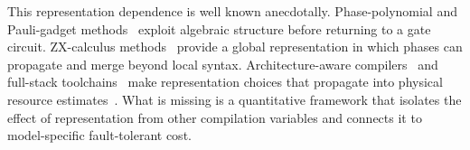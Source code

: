 \documentclass[aps,prx,reprint,floatfix,superscriptaddress]{revtex4-2}
\begin{document}
This representation dependence is well known anecdotally. Phase-polynomial
and Pauli-gadget
methods~\cite{amy2014tdepth,nam2018automated,cowtan2020phase,amy2019cnot,beaudrap2020techniques}
exploit algebraic structure before returning to a gate circuit.
ZX-calculus
methods~\cite{duncan2020graph,kissinger2020reducing,kissinger2020pyzx,vandewetering2020zx}
provide a global representation in which phases can propagate and merge
beyond local syntax. Architecture-aware
compilers~\cite{martiel2022architecture,meijer2023architecture} and full-stack
toolchains~\cite{watkins2024surfacecode} make representation choices that
propagate into physical resource
estimates~\cite{beverland2022assessing}. What is missing is a
quantitative framework that isolates the effect of representation from
other compilation variables and connects it to model-specific
fault-tolerant cost.
\end{document}
